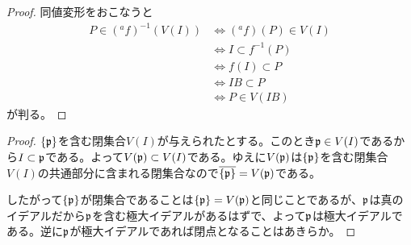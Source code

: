 
\begin{proof}
  同値変形をおこなうと
  \begin{align*}
    P \in ({}^af)^{-1}(V(I)) &\iff ({}^af)(P) \in V(I) \\
    &\iff I \subset f^{-1}(P) \\
    &\iff f(I) \subset P \\
    &\iff IB \subset P \\
    &\iff P \in V(IB)
  \end{align*}
  が判る。
\end{proof}



\begin{proof}
$\{ \mathfrak{p} \}$を含む閉集合$V(I)$が与えられたとする。このとき$\mathfrak{p} \in V(I)$であるから$I \subset \mathfrak{p}$である。よって$V(\mathfrak{p}) \subset V(I)$である。ゆえに$V(\mathfrak{p})$は$\{ \mathfrak{p} \}$を含む閉集合$V(I)$の共通部分に含まれる閉集合なので$\overline{\{ \mathfrak{p} \}} = V(\mathfrak{p})$である。

したがって$\{ \mathfrak{p} \}$が閉集合であることは$\{\mathfrak{p}\}=V(\mathfrak{p})$と同じことであるが、$\mathfrak{p}$は真のイデアルだから$\mathfrak{p}$を含む極大イデアルがあるはずで、よって$\mathfrak{p}$は極大イデアルである。逆に$\mathfrak{p}$が極大イデアルであれば閉点となることはあきらか。
\end{proof}





